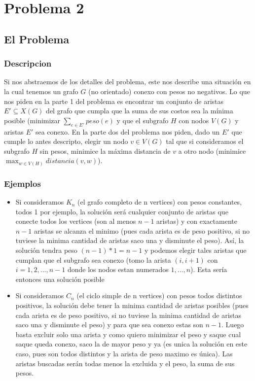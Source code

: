 \documentclass[A4paper,oneside,fleqn,11pt]{article}
\theoremstyle{definition}
\begin{document}
\section{Problema 2}
\subsection{El Problema}

\subsubsection{Descripcion}
Si nos abstraemos de los detalles del problema, este nos describe una situación en la cual tenemos un grafo $G$ (no orientado) conexo con pesos no negativos. Lo que nos piden en la parte 1 del problema es encontrar un conjunto de aristas $E' \subseteq X(G)$ del grafo que cumpla que la suma de sus costos sea la mínima posible (minimizar $\sum_{e \in E'} {peso(e)}$ y que el subgrafo $H$ con nodos $V(G)$ y aristas $E'$ sea conexo. En la parte dos
del problema nos piden, dado un $E'$ que cumple lo antes descripto, elegir un nodo $v \in V(G)$ tal que si consideramos el subgrafo $H$ sin pesos, minimice la máxima distancia de $v$ a otro nodo (minimice $\max_{w\in V(H)}{distancia(v,w)}$).

\subsubsection{Ejemplos}
\begin{itemize}

\item Si consideramos $K_{n}$  (el grafo completo de n vertices) con pesos constantes, todos 1 por ejemplo, la solución será cualquier conjunto de aristas que conecte todos los vertices (son al menos $n-1$ aristas) y con exactamente $n-1$ aristas se alcanza el minimo (pues cada arista es de peso positivo, si no tuviese la minima cantidad de aristas saco una y disminute el peso). Así, la solución tendra peso $(n-1)*1=n-1$ y podemos elegir tales aristas que cumplan que el subgrafo sea conexo (tomo la arista $(i,i+1)$ con $i=1,2,...,n-1$ donde los nodos estan numerados $1,...,n$). Esta sería entonces una solución posible
\item Si consideramos $C_{n}$ (el ciclo simple de n vertices) con pesos todos distintos positivos, la solución debe tener la minima cantidad de aristas posibles (pues cada arista es de peso positivo, si no tuviese la minima cantidad de aristas saco una y disminute el peso) y para que sea conexo estas son $n-1$. Luego basta excluir solo una arista y como quiero minimizar el peso y saque cual saque queda conexo, saco la de mayor peso y ya (es unica la solución en este caso, pues son todos distintos y la  arista de peso maximo es única). Las aristas buscadas serán todas menos la excluida y el peso, la suma de sus pesos.

\end{itemize}
\end{document}
